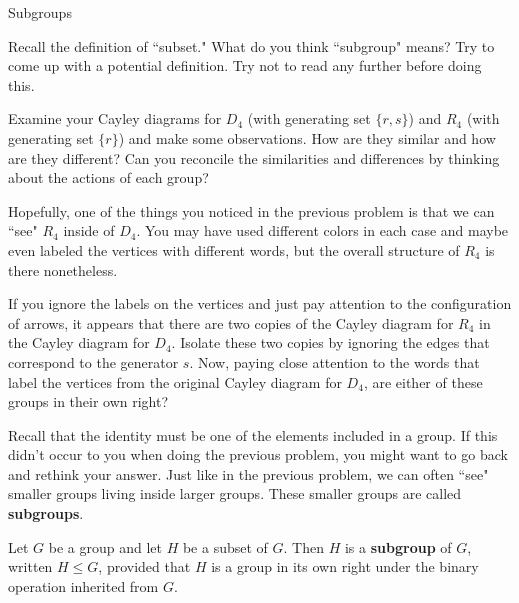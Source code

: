 \begin{section}{Subgroups}


\begin{problem}
Recall the definition of ``subset."  What do you think ``subgroup" means?  Try to come up with a potential definition.  Try not to read any further before doing this.
\end{problem}

\begin{problem}\label{prob:R4_in_D4}
Examine your Cayley diagrams for $D_4$ (with generating set $\{r,s\}$) and $R_4$ (with generating set $\{r\}$) and make some observations.  How are they similar and how are they different?  Can you reconcile the similarities and differences by thinking about the actions of each group?
\end{problem}

Hopefully, one of the things you noticed in the previous problem is that we can ``see" $R_4$ inside of $D_4$.  You may have used different colors in each case and maybe even labeled the vertices with different words, but the overall structure of $R_4$ is there nonetheless.

\begin{problem}\label{prob:R4_subgroup_D_4}
If you ignore the labels on the vertices and just pay attention to the configuration of arrows, it appears that there are two copies of the Cayley diagram for $R_4$ in the Cayley diagram for $D_4$.  Isolate these two copies by ignoring the edges that correspond to the generator $s$.  Now, paying close attention to the words that label the vertices from the original Cayley diagram for $D_4$, are either of these groups in their own right?
\end{problem}

Recall that the identity must be one of the elements included in a group.  If this didn't occur to you when doing the previous problem, you might want to go back and rethink your answer.  Just like in the previous problem, we can often ``see" smaller groups living inside larger groups.  These smaller groups are called \textbf{subgroups}.

\begin{definition}
Let $G$ be a group and let $H$ be a subset of $G$.  Then $H$ is a \textbf{subgroup} of $G$, written $H\leq G$, provided that $H$ is a group in its own right under the binary operation inherited from $G$.
\end{definition}


\end{section}
